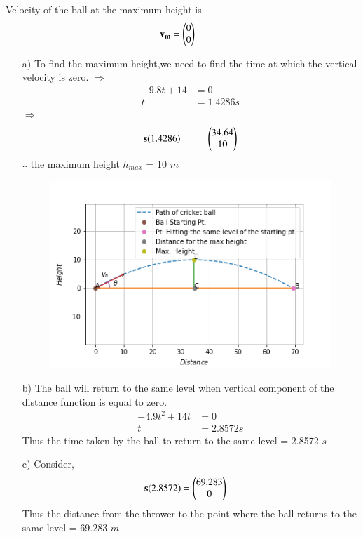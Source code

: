 \documentclass[journal,12pt,twocolumn]{IEEEtran}
\begin{document}
Velocity of the ball at the maximum height is
\begin{align}
    \mathbf{v_m} &= \begin{pmatrix}0 \\ 0\end{pmatrix}
\end{align}
\begin{enumerate}
\item[a)]To find the maximum height,we need to find the time at which the vertical velocity is zero.
$\Longrightarrow$
\begin{align}
    -9.8t+14 &=0\\
    t &= 1.4286 s
    \end{align}
$\Longrightarrow$
\begin{align}
\mathbf{s}(1.4286)&=
&=\begin{pmatrix}34.64\\10\end{pmatrix}
\end{align}
$\therefore$ the maximum height $h_{max}$ = 10 $m$

\begin{figure}[!ht]
\centering
    \includegraphics[width= \columnwidth]{assignment5.png}
    \caption{} \label{fig:1}
\end{figure}
\item[b)]The ball will return to the same level when vertical component of the distance function is equal to zero.
\begin{align}
    -4.9{t^2}+14t &= 0\\
    t &= 2.8572 s
\end{align}
Thus the time taken by the ball to return to the same level = 2.8572 $s$

\item[c)]Consider,
\begin{align}
    \mathbf{s}(2.8572) &=\begin{pmatrix}69.283\\0\end{pmatrix}
\end{align}
Thus the distance from the thrower to the point where the ball returns to the same level = 69.283 $m$

\end{enumerate}
\end{document}
